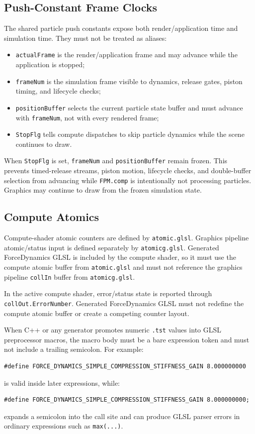 \subsection{Push-Constant Frame Clocks}

The shared particle push constants expose both render/application time and
simulation time.  They must not be treated as aliases:
\begin{itemize}
    \item \texttt{actualFrame} is the render/application frame and may advance
          while the application is stopped;
    \item \texttt{frameNum} is the simulation frame visible to dynamics,
          release gates, piston timing, and lifecycle checks;
    \item \texttt{positionBuffer} selects the current particle state buffer and
          must advance with \texttt{frameNum}, not with every rendered frame;
    \item \texttt{StopFlg} tells compute dispatches to skip particle dynamics
          while the scene continues to draw.
\end{itemize}

When \texttt{StopFlg} is set, \texttt{frameNum} and
\texttt{positionBuffer} remain frozen.  This prevents timed-release streams,
piston motion, lifecycle checks, and double-buffer selection from advancing
while \texttt{FPM.comp} is intentionally not processing particles.  Graphics
may continue to draw from the frozen simulation state.

\subsection{Compute Atomics}

Compute-shader atomic counters are defined by \texttt{atomic.glsl}.  Graphics
pipeline atomic/status input is defined separately by \texttt{atomicg.glsl}.
Generated ForceDynamics GLSL is included by the compute shader, so it must use
the compute atomic buffer from \texttt{atomic.glsl} and must not reference the
graphics pipeline \texttt{collIn} buffer from \texttt{atomicg.glsl}.

In the active compute shader, error/status state is reported through
\texttt{collOut.ErrorNumber}.  Generated ForceDynamics GLSL must not redefine
the compute atomic buffer or create a competing counter layout.

When C++ or any generator promotes numeric \texttt{.tst} values into GLSL
preprocessor macros, the macro body must be a bare expression token and must
not include a trailing semicolon.  For example:
\begin{verbatim}
#define FORCE_DYNAMICS_SIMPLE_COMPRESSION_STIFFNESS_GAIN 8.000000000
\end{verbatim}
is valid inside later expressions, while:
\begin{verbatim}
#define FORCE_DYNAMICS_SIMPLE_COMPRESSION_STIFFNESS_GAIN 8.000000000;
\end{verbatim}
expands a semicolon into the call site and can produce GLSL parser errors in
ordinary expressions such as \texttt{max(...)}.

